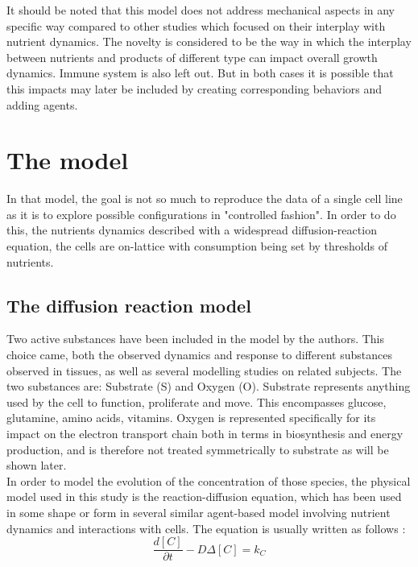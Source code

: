\documentclass[11pt,a4paper]{article}
\begin{document}
It should be noted that this model does not address mechanical aspects in any specific way compared to other studies which focused on their interplay with nutrient dynamics.\cite{Milotti2010}\cite{Bull2020} The novelty is considered to be the way in which the interplay between nutrients and products of different type can impact overall growth dynamics. Immune system is also left out. But in both cases it is possible that this impacts may later be included by creating corresponding behaviors and adding agents.\\

\newpage
\section{The model}
In that model, the goal is not so much to reproduce the data of a single cell line as it is to explore possible configurations in "controlled fashion". In order to do this, the nutrients dynamics described with a widespread diffusion-reaction equation, the cells are on-lattice with consumption being set by thresholds of nutrients.\\

\subsection{The diffusion reaction model}
Two active substances have been included in the model by the authors. This choice came, both the observed dynamics and response to different substances observed in tissues, as well as several modelling studies on related subjects.\cite{Bull2020}\cite{Kempf2005}\cite{Mao2018}\cite{Jagiella2016} The two substances are: Substrate (S) and  Oxygen (O). Substrate represents anything used by the cell to function, proliferate and move. This encompasses glucose, glutamine, amino acids, vitamins. Oxygen is represented specifically for its impact on the electron transport chain both in terms in biosynthesis and energy production, and is therefore not treated symmetrically to substrate as will be shown later. \\

In order to model the evolution of the concentration of those species, the physical model used in this study is the reaction-diffusion equation, which has been used in some shape or form in several similar agent-based model involving nutrient dynamics and interactions with cells.\cite{Bull2020}\cite{Kempf2005}\cite{Mao2018}\cite{Cleri2019}\cite{Kempf2015}
The equation is usually written as follows : 
\[ \frac{d [C]}{\partial t}  -  D \Delta [C] = k_C  \]
\end{document}
